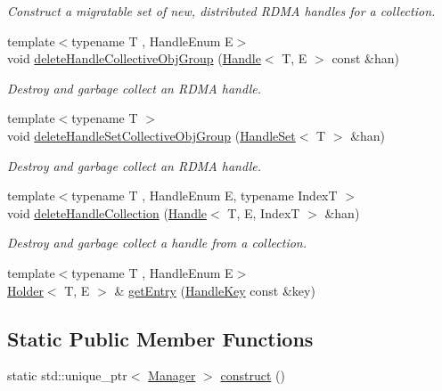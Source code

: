\begin{DoxyCompactItemize}
\begin{DoxyCompactList}\small\item\em Construct a migratable set of new, distributed R\+D\+MA handles for a collection. \end{DoxyCompactList}\item 
{\footnotesize template$<$typename T , Handle\+Enum E$>$ }\\void \hyperlink{structvt_1_1rdma_1_1_manager_a4219310feca011fd242e654c9ba51280}{delete\+Handle\+Collective\+Obj\+Group} (\hyperlink{structvt_1_1rdma_1_1_handle}{Handle}$<$ T, E $>$ const \&han)
\begin{DoxyCompactList}\small\item\em Destroy and garbage collect an R\+D\+MA handle. \end{DoxyCompactList}\item 
{\footnotesize template$<$typename T $>$ }\\void \hyperlink{structvt_1_1rdma_1_1_manager_a9b3b9bf148a8225295879481345e4af3}{delete\+Handle\+Set\+Collective\+Obj\+Group} (\hyperlink{structvt_1_1rdma_1_1_handle_set}{Handle\+Set}$<$ T $>$ \&han)
\begin{DoxyCompactList}\small\item\em Destroy and garbage collect an R\+D\+MA handle. \end{DoxyCompactList}\item 
{\footnotesize template$<$typename T , Handle\+Enum E, typename IndexT $>$ }\\void \hyperlink{structvt_1_1rdma_1_1_manager_a3a1f982e986d58e91837a2b1aa048468}{delete\+Handle\+Collection} (\hyperlink{structvt_1_1rdma_1_1_handle}{Handle}$<$ T, E, IndexT $>$ \&han)
\begin{DoxyCompactList}\small\item\em Destroy and garbage collect a handle from a collection. \end{DoxyCompactList}\item 
{\footnotesize template$<$typename T , Handle\+Enum E$>$ }\\\hyperlink{structvt_1_1rdma_1_1_holder}{Holder}$<$ T, E $>$ \& \hyperlink{structvt_1_1rdma_1_1_manager_a60c463246971a6d782e55f13fd60d092}{get\+Entry} (\hyperlink{structvt_1_1rdma_1_1_handle_key}{Handle\+Key} const \&key)
\end{DoxyCompactItemize}
\subsection*{Static Public Member Functions}
\begin{DoxyCompactItemize}
\item 
static std\+::unique\+\_\+ptr$<$ \hyperlink{structvt_1_1rdma_1_1_manager}{Manager} $>$ \hyperlink{structvt_1_1rdma_1_1_manager_ab79a91b3feabfc37e6f0b5000e9d3949}{construct} ()
\end{DoxyCompactItemize}


